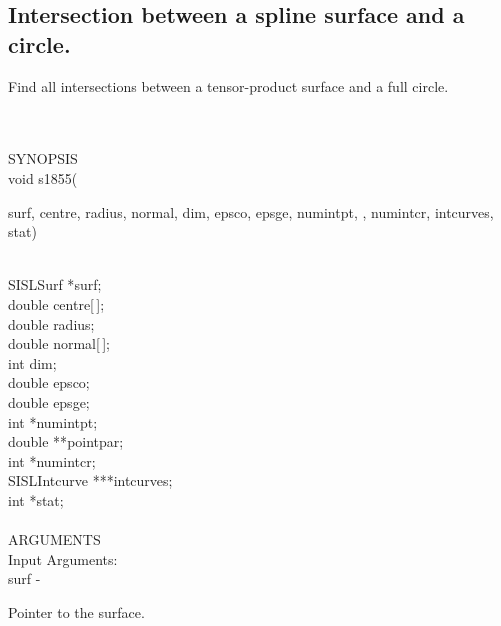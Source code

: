 \subsection{Intersection between a spline surface and a circle.}
\begin{minipg1}
  Find all intersections between a tensor-product surface and a full circle.
\end{minipg1} \\ \\
SYNOPSIS\\
        \>void s1855(\begin{minipg3}
                {\fov surf}, {\fov centre}, {\fov radius}, {\fov normal}, {\fov dim}, {\fov epsco}, {\fov epsge},
                {\fov numintpt}, , {\fov numintcr}, {\fov intcurves}, {\fov stat})
                \end{minipg3}\\[0.3ex]
                \>\>    SISLSurf        \>      *{\fov surf};\\
                \>\>    double  \>      {\fov centre}[\,];\\
                \>\>    double  \>      {\fov radius};\\
                \>\>    double  \>      {\fov normal}[\,];\\
                \>\>    int     \>      {\fov dim};\\
                \>\>    double  \>      {\fov epsco};\\
                \>\>    double  \>      {\fov epsge};\\
                \>\>    int     \>      *{\fov numintpt};\\
                \>\>    double  \>      **{\fov pointpar};\\
                \>\>    int     \>      *{\fov numintcr};\\
                \>\>    SISLIntcurve\>  ***{\fov intcurves};\\
                \>\>    int     \>      *{\fov stat};\\
\\
ARGUMENTS\\
        \>Input Arguments:\\
        \>\>    {\fov surf}\> - \>      \begin{minipg2}
                                Pointer to the surface.
                                \end{minipg2}\\
